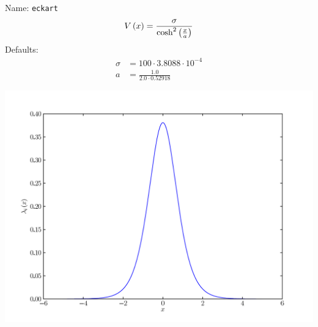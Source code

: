 \documentclass[a4paper,10pt]{report}
\begin{document}
\begin{minipage}{0.5\linewidth}
  Name:    \texttt{eckart}
  \begin{equation*}
    V\left( x \right) = \frac{\sigma}{\operatorname{cosh}^{2}\left(\frac{x}{a}\right)}
  \end{equation*}
  Defaults:
  \begin{align*}
    \sigma & = 100 \cdot 3.8088 \cdot 10^{-4} \\
    a &= \frac{1.0}{2.0 \cdot 0.52918}
  \end{align*}
\end{minipage}
\begin{minipage}{0.5\linewidth}
  \begin{center}
    \includegraphics[scale=0.25]{./fig/eckart.pdf}
  \end{center}
\end{minipage}
\end{document}
